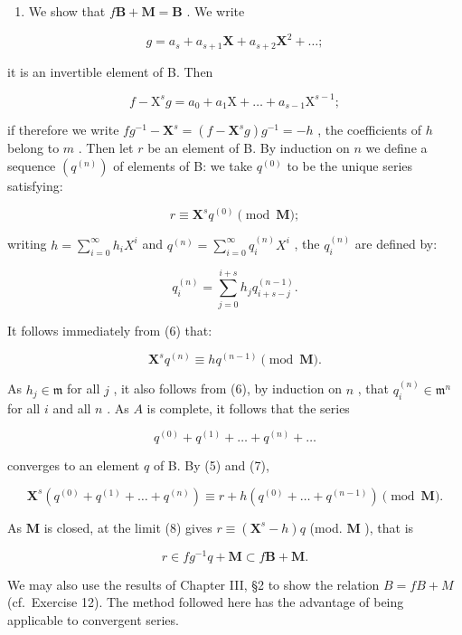 \begin{enumerate}
\def\labelenumi{(\alph{enumi})}
\setcounter{enumi}{1}
\tightlist
\item
  We show that \(f\mathbf{B} + \mathbf{M} = \mathbf{B}\) . We write
\end{enumerate}

\[
g = a _ {s} + a _ {s + 1} \mathbf {X} + a _ {s + 2} \mathbf {X} ^ {2} + \dots ;
\]

it is an invertible element of B. Then

\[
f - \mathrm{X} ^ {s} g = a _ {0} + a _ {1} \mathrm{X} + \dots + a _ {s - 1} \mathrm{X} ^ {s - 1};
\]

if therefore we write \(fg^{-1} - \mathbf{X}^s = (f - \mathbf{X}^s g)g^{-1} = -h\) , the coefficients of \(h\) belong to \(m\) . Then let \(r\) be an element of B. By induction on \(n\) we define a sequence \((q^{(n)})\) of elements of B: we take \(q^{(0)}\) to be the unique series satisfying:

\[
r \equiv \mathbf {X} ^ {s} q ^ {(0)} \pmod {\mathbf {M}};\tag{5}
\]

writing \(h = \sum_{i=0}^{\infty} h_i X^i\) and \(q^{(n)} = \sum_{i=0}^{\infty} q_i^{(n)} X^i\) , the \(q_i^{(n)}\) are defined by:

\[
q _ {i} ^ {(n)} = \sum_ {j = 0} ^ {i + s} h _ {j} q _ {i + s - j} ^ {(n - 1)}.\tag{6}
\]

It follows immediately from (6) that:

\[
\mathbf {X} ^ {s} q ^ {(n)} \equiv h q ^ {(n - 1)} \pmod {\mathbf {M}}.\tag{7}
\]

As \(h_j \in \mathfrak{m}\) for all \(j\) , it also follows from (6), by induction on \(n\) , that \(q_i^{(n)} \in \mathfrak{m}^n\) for all \(i\) and all \(n\) . As \(A\) is complete, it follows that the series

\[
q ^ {(0)} + q ^ {(1)} + \dots + q ^ {(n)} + \dots
\]

converges to an element \(q\) of B. By (5) and (7),

\[
\mathbf {X} ^ {s} (q ^ {(0)} + q ^ {(1)} + \dots + q ^ {(n)}) \equiv r + h (q ^ {(0)} + \dots + q ^ {(n - 1)}) \pmod {\mathbf {M}}. \tag {8}
\]

As \(\mathbf{M}\) is closed, at the limit (8) gives \(r \equiv (\mathbf{X}^s - h)q\) (mod. \(\mathbf{M}\) ), that is

\[
r \in f g ^ {- 1} q + \mathbf {M} \subset f \mathbf {B} + \mathbf {M}.
\]

We may also use the results of Chapter III, §2 to show the relation \(B = fB + M\) (cf.~Exercise 12). The method followed here has the advantage of being applicable to convergent series.

